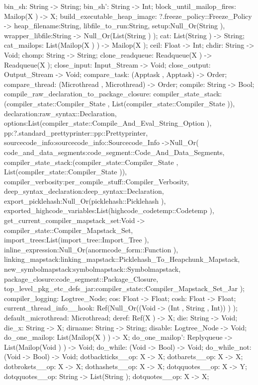 bin_sh: String -> String;
bin_sh': String -> Int;
block_until_mailop_fires: Mailop(X ) -> X;
build_executable_heap_image:
    ?.freeze_policy::Freeze_Policy
    ->
    {heap_filename:String, libfile_to_run:String, setup:Null_Or(String ), wrapper_libfile:String}
    ->
    Null_Or(List(String ) );
cat: List(String ) -> String;
cat_mailops: List(Mailop(X ) ) -> Mailop(X );
ceil: Float -> Int;
chdir: String -> Void;
chomp: String -> String;
clone_readqueue: Readqueue(X ) -> Readqueue(X );
close_input: Input_Stream -> Void;
close_output: Output_Stream -> Void;
compare_task: (Apptask , Apptask) -> Order;
compare_thread: (Microthread , Microthread) -> Order;
compile: String -> Bool;
compile_raw_declaration_to_package_closure:
        {compiler_state_stack:(compiler_state::Compiler_State , List(compiler_state::Compiler_State )),
        declaration:raw_syntax::Declaration, options:List(compiler_state::Compile_And_Eval_String_Option ),
        pp:?.standard_prettyprinter::pp::Prettyprinter, sourcecode_info:sourcecode_info::Sourcecode_Info}
    ->Null_Or(
        {code_and_data_segments:code_segment::Code_And_Data_Segments,
        compiler_state_stack:(compiler_state::Compiler_State , List(compiler_state::Compiler_State )),
        compiler_verbosity:per_compile_stuff::Compiler_Verbosity,
        deep_syntax_declaration:deep_syntax::Declaration,
        export_picklehash:Null_Or(picklehash::Picklehash ),
        exported_highcode_variables:List(highcode_codetemp::Codetemp ),
        get_current_compiler_mapstack_set:Void -> compiler_state::Compiler_Mapstack_Set,
        import_trees:List(import_tree::Import_Tree ), inline_expression:Null_Or(anormcode_form::Function ),
        linking_mapstack:linking_mapstack::Picklehash_To_Heapchunk_Mapstack,
        new_symbolmapstack:symbolmapstack::Symbolmapstack, package_closure:code_segment::Package_Closure,
        top_level_pkg_etc_defs_jar:compiler_state::Compiler_Mapstack_Set_Jar}
       );
compiler_logging: Logtree_Node;
cos: Float -> Float;
cosh: Float -> Float;
current_thread_info__hook: Ref(Null_Or((Void -> (Int , String , Int)) ) );
default_microthread: Microthread;
deref: Ref(X ) -> X;
die: String -> Void;
die_x: String -> X;
dirname: String -> String;
disable: Logtree_Node -> Void;
do_one_mailop: List(Mailop(X ) ) -> X;
do_one_mailop': Replyqueue -> List(Mailop(Void ) ) -> Void;
do_while: (Void -> Bool) -> Void;
do_while_not: (Void -> Bool) -> Void;
dotbackticks__op: X -> X;
dotbarets__op: X -> X;
dotbrokets__op: X -> X;
dothashets__op: X -> X;
dotqquotes__op: X -> Y;
dotqquotes__op: String -> List(String );
dotquotes__op: X -> X;
